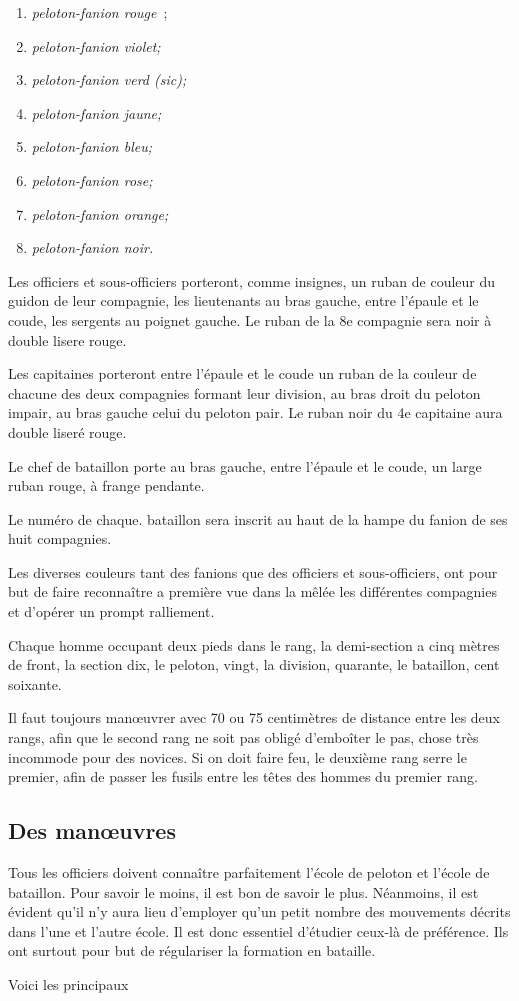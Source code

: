 \documentclass[french,twoside]{book} %
\begin{document}
\begin{enumerate}[itemsep=0pt,]
\item \emph{peloton-fanion rouge} ;
\item  \emph{peloton-fanion violet;} 
\item  \emph{peloton-fanion verd (\emph{sic});} 
\item  \emph{peloton-fanion jaune;} 
\item  \emph{peloton-fanion bleu;} 
\item  \emph{peloton-fanion rose;} 
\item  \emph{peloton-fanion orange;} 
\item  \emph{peloton-fanion noir.} 

\end{enumerate}\noindent Les officiers et sous-officiers porteront, comme insignes, un ruban de couleur du guidon de leur compagnie, les lieutenants au bras gauche, entre l’épaule et le coude, les sergents au poignet gauche. Le ruban de la 8e compagnie sera noir à double lisere rouge.\par
Les capitaines porteront entre l’épaule et le coude un ruban de la couleur de chacune des deux compagnies formant leur division, au bras droit du peloton impair, au bras gauche celui du peloton pair. Le ruban noir du 4e capitaine aura double liseré rouge.\par
Le chef de bataillon porte au bras gauche, entre l’épaule et le coude, un large ruban rouge, à frange pendante.\par
Le numéro de chaque. bataillon sera inscrit au haut de la hampe du fanion de ses huit compagnies.\par
Les diverses couleurs tant des fanions que des officiers et sous-officiers, ont pour but de faire reconnaître a première vue dans la mêlée les différentes compagnies et d’opérer un prompt ralliement.\par
Chaque homme occupant deux pieds dans le rang, la demi-section a cinq mètres de front, la section dix, le peloton, vingt, la division, quarante, le bataillon, cent soixante.\par
Il faut toujours manœuvrer avec 70 ou 75 centimètres de distance entre les deux rangs, afin que le second rang ne soit pas obligé d’emboîter le pas, chose très incommode pour des novices. Si on doit faire feu, le deuxième rang serre le premier, afin de passer les fusils entre les têtes des hommes du premier rang.
\subsection[Des manœuvres]{Des manœuvres}
\noindent Tous les officiers doivent connaître parfaitement l’école de peloton et l’école de bataillon. Pour savoir le moins, il est bon de savoir le plus. Néanmoins, il est évident qu’il n’y aura lieu d’employer qu’un petit nombre des mouvements décrits dans l’une et l’autre école. Il est donc essentiel d’étudier ceux-là de préférence. Ils ont surtout pour but de régulariser la formation en bataille.\par
Voici les principaux\par
\end{document}
